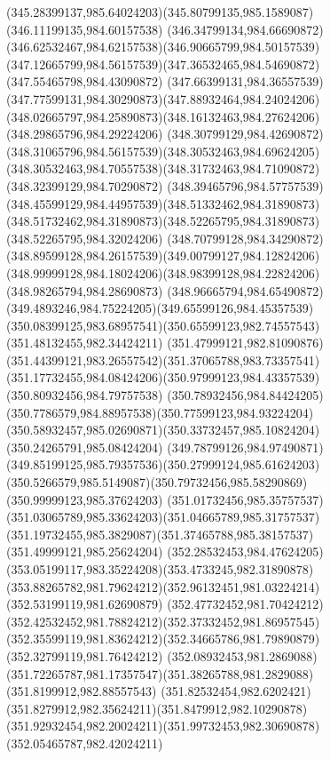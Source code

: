 {{		\curveto(345.28399137,985.64024203)(345.80799135,985.1589087)(346.11199135,984.60157538)
		\curveto(346.34799134,984.66690872)(346.62532467,984.62157538)(346.90665799,984.50157539)
		\curveto(347.12665799,984.56157539)(347.36532465,984.54690872)(347.55465798,984.43090872)
		\curveto(347.66399131,984.36557539)(347.77599131,984.30290873)(347.88932464,984.24024206)
		\curveto(348.02665797,984.25890873)(348.16132463,984.27624206)(348.29865796,984.29224206)
		\curveto(348.30799129,984.42690872)(348.31065796,984.56157539)(348.30532463,984.69624205)
		\curveto(348.30532463,984.70557538)(348.31732463,984.71090872)(348.32399129,984.70290872)
		\curveto(348.39465796,984.57757539)(348.45599129,984.44957539)(348.51332462,984.31890873)
		\curveto(348.51732462,984.31890873)(348.52265795,984.31890873)(348.52265795,984.32024206)
		\curveto(348.70799128,984.34290872)(348.89599128,984.26157539)(349.00799127,984.12824206)
		\curveto(348.99999128,984.18024206)(348.98399128,984.22824206)(348.98265794,984.28690873)
		\curveto(348.96665794,984.65490872)(349.4893246,984.75224205)(349.65599126,984.45357539)
		\curveto(350.08399125,983.68957541)(350.65599123,982.74557543)(351.48132455,982.34424211)
		\curveto(351.47999121,982.81090876)(351.44399121,983.26557542)(351.37065788,983.73357541)
		\curveto(351.17732455,984.08424206)(350.97999123,984.43357539)(350.80932456,984.79757538)
		\curveto(350.78932456,984.84424205)(350.7786579,984.88957538)(350.77599123,984.93224204)
		\curveto(350.58932457,985.02690871)(350.33732457,985.10824204)(350.24265791,985.08424204)
		\curveto(349.78799126,984.97490871)(349.85199125,985.79357536)(350.27999124,985.61624203)
		\curveto(350.5266579,985.5149087)(350.79732456,985.58290869)(350.99999123,985.37624203)
		\curveto(351.01732456,985.35757537)(351.03065789,985.33624203)(351.04665789,985.31757537)
		\curveto(351.19732455,985.3829087)(351.37465788,985.38157537)(351.49999121,985.25624204)
		\curveto(352.28532453,984.47624205)(353.05199117,983.35224208)(353.4733245,982.31890878)
		\curveto(353.88265782,981.79624212)(352.96132451,981.03224214)(352.53199119,981.62690879)
		\curveto(352.47732452,981.70424212)(352.42532452,981.78824212)(352.37332452,981.86957545)
		\curveto(352.35599119,981.83624212)(352.34665786,981.79890879)(352.32799119,981.76424212)
		\curveto(352.08932453,981.2869088)(351.72265787,981.17357547)(351.38265788,981.2829088)
		\moveto(351.8199912,982.88557543)
		\curveto(351.82532454,982.6202421)(351.8279912,982.35624211)(351.8479912,982.10290878)
		\curveto(351.92932454,982.20024211)(351.99732453,982.30690878)(352.05465787,982.42024211)
}}
